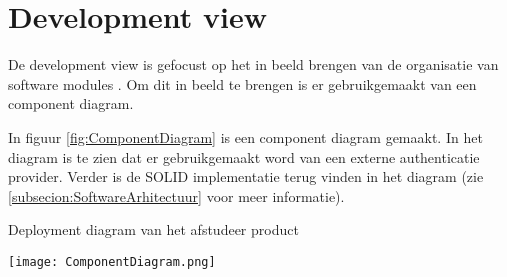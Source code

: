 \section{Development view}
De development view is gefocust op het in beeld brengen van de organisatie van software modules \parencite{4p1Model}.
Om dit in beeld te brengen is er gebruikgemaakt van een component diagram.

\whitespace
In figuur \ref{fig:ComponentDiagram} is een component diagram gemaakt.
In het diagram is te zien dat er gebruikgemaakt word van een externe authenticatie provider.
Verder is de SOLID implementatie terug vinden in het diagram (zie \ref{subsecion:SoftwareArhitectuur} voor meer informatie). 

\whitespace[2]
\begin{graphic}
    \captionsetup{type=figure}
    \caption{Deployment diagram van het afstudeer product}
    \texttt{[image: ComponentDiagram.png]}
    \label{fig:ComponentDiagram}
\end{graphic}
